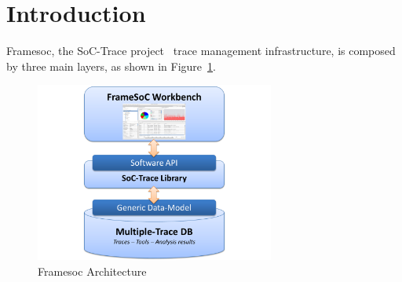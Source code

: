 \documentclass[twoside]{article}
\begin{document}
\begin{sloppypar} %

\shorthandoff{:} %

\newcommand{\parag}[1]{\paragraph{#1}\mbox{}\\}
\newcommand{\subparag}[1]{\subparagraph{#1}\mbox{}\\}
\newcommand{\subsubparag}[1]{\subparagraph{#1}}
\renewcommand{\labelitemi}{$\bullet$}
\renewcommand{\labelitemii}{$\circ$}

\makeRT 

\renewcommand{\contentsname}{Table of contents}
\tableofcontents
\newpage
\section{Introduction}
\label{sec:introduction}


Framesoc, the SoC-Trace project~\cite{SoC-TRACE} trace management infrastructure, is composed by three main layers, as shown in Figure~\ref{fig:architecture}.

\begin{figure}[h]
  \centering
    \includegraphics[width=0.7\textwidth]{images/framesoc_architecture.pdf}
  \caption{Framesoc Architecture}
  \label{fig:architecture}
\end{figure}


\end{sloppypar}
\end{document}
